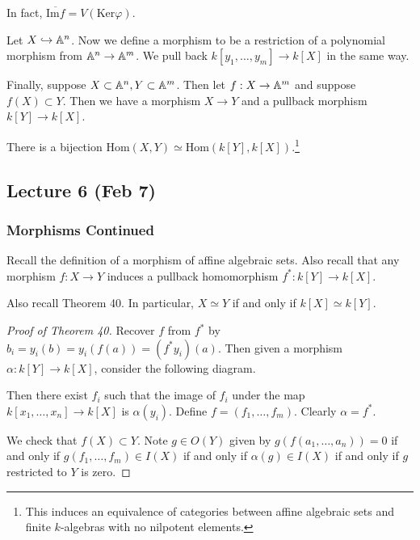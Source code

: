 \documentclass[twoside, 10pt]{article}
\begin{document}
    In fact, $\overline{\mathrm{Im} f} = V(\mathrm{Ker}\varphi)$.

    Let $X \hookrightarrow \mathbb{A}^n$. Now we define a morphism to be a restriction
    of a polynomial morphism from $\mathbb{A}^n \rightarrow \mathbb{A}^m$. We pull back $k[y_1,
    \ldots, y_m] \rightarrow k[X]$ in the same way.

    Finally, suppose $X \subset \mathbb{A}^n, Y \subset \mathbb{A}^m$. Then let $f:X
    \rightarrow \mathbb{A}^m$ and suppose $f(X) \subset Y$. Then we have a morphism $X
    \rightarrow Y$ and a pullback morphism $k[Y] \rightarrow k[X]$.

    \begin{thm} There is a bijection $\mathrm{Hom}(X,Y) \simeq
    \mathrm{Hom}(k[Y], k[X])$.\footnote{This induces an equivalence of
categories between affine algebraic sets and finite $k$-algebras with no
nilpotent elements.} \end{thm}

    \subsection{Lecture 6 (Feb 7)}

    \subsubsection{Morphisms Continued} Recall the definition of a morphism of
    affine algebraic sets. Also recall that any morphism $f : X \rightarrow Y$
    induces a pullback homomorphism $f^*: k[Y] \rightarrow k[X]$.
    
    Also recall Theorem 40. In particular, $X \simeq Y$ if and only if $k[X]
    \simeq k[Y]$.

    \begin{proof}[Proof of Theorem 40] Recover $f$ from $f^*$ by $b_i = y_i(b)
        = y_i(f(a)) = (f^*y_i)(a)$.  Then given a morphism $\alpha: k[Y]
        \rightarrow k[X]$, consider the following diagram.

        \begin{center}  \end{center}

        Then there exist $f_i$ such that the image of $f_i$ under the map
        $k[x_1, \ldots, x_n] \rightarrow k[X]$ is $\alpha(y_i)$. Define $f =
        (f_1, \ldots, f_m)$. Clearly $\alpha = f^*$. 

        We check that $f(X) \subset Y$. Note $g \in O(Y)$ given by $g(f(a_1,
    \ldots, a_n)) = 0$ if and only if $g(f_1, \ldots, f_m) \in I(X)$ if and
only if $\alpha(g) \in I(X)$ if and only if $g$ restricted to $Y$ is zero.
        \end{proof}
\end{document}
